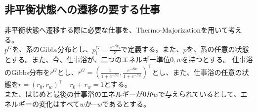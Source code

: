 \documentclass[a4paper,11pt]{jsarticle}
\numberwithin{equation}{section}
\begin{document}
\subsection{非平衡状態への遷移の要する仕事}
非平衡状態へ遷移する際に必要な仕事を、Thermo-Majorizationを用いて考える。\\
$p^G$を、系のGibbs分布とし、$p_{i}^G = \frac{e^{-\beta E_i}}{Z}$で定義する。また、$p$を、系の任意の状態とする。また、今、仕事浴が、二つのエネルギー準位$0,w$を持つとする。
仕事浴のGibbs分布を$r^G$とし、$r^G = (\frac{1}{1+e^{-\beta w}},\frac{e^{-\beta w}}{1+e^{-\beta w}})^{\top}$とし、また、仕事浴の任意の状態を$r=(r_0,r_w)^{\top} \quad r_0+r_w=1$とする。\\
また、はじめと最後の仕事浴のエネルギーが$0$か$w$で与えられているとして、エネルギーの変化はすべて$w$か$-w$であるとする。
\end{document}

